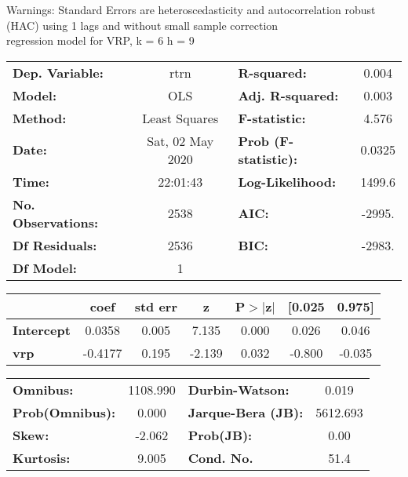 Warnings: \newline
 [1] Standard Errors are heteroscedasticity and autocorrelation robust (HAC) using 1 lags and without small sample correction\\ 

regression model for VRP, k = 6 h = 9\begin{center}
\begin{tabular}{lclc}
\toprule
\textbf{Dep. Variable:}    &       rtrn       & \textbf{  R-squared:         } &     0.004   \\
\textbf{Model:}            &       OLS        & \textbf{  Adj. R-squared:    } &     0.003   \\
\textbf{Method:}           &  Least Squares   & \textbf{  F-statistic:       } &     4.576   \\
\textbf{Date:}             & Sat, 02 May 2020 & \textbf{  Prob (F-statistic):} &   0.0325    \\
\textbf{Time:}             &     22:01:43     & \textbf{  Log-Likelihood:    } &    1499.6   \\
\textbf{No. Observations:} &        2538      & \textbf{  AIC:               } &    -2995.   \\
\textbf{Df Residuals:}     &        2536      & \textbf{  BIC:               } &    -2983.   \\
\textbf{Df Model:}         &           1      & \textbf{                     } &             \\
\bottomrule
\end{tabular}
\begin{tabular}{lcccccc}
                   & \textbf{coef} & \textbf{std err} & \textbf{z} & \textbf{P$> |$z$|$} & \textbf{[0.025} & \textbf{0.975]}  \\
\midrule
\textbf{Intercept} &       0.0358  &        0.005     &     7.135  &         0.000        &        0.026    &        0.046     \\
\textbf{vrp}       &      -0.4177  &        0.195     &    -2.139  &         0.032        &       -0.800    &       -0.035     \\
\bottomrule
\end{tabular}
\begin{tabular}{lclc}
\textbf{Omnibus:}       & 1108.990 & \textbf{  Durbin-Watson:     } &    0.019  \\
\textbf{Prob(Omnibus):} &   0.000  & \textbf{  Jarque-Bera (JB):  } & 5612.693  \\
\textbf{Skew:}          &  -2.062  & \textbf{  Prob(JB):          } &     0.00  \\
\textbf{Kurtosis:}      &   9.005  & \textbf{  Cond. No.          } &     51.4  \\
\bottomrule
\end{tabular}
\end{center}

